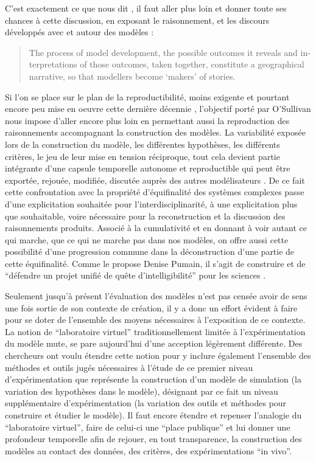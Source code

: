 C'est exactement ce que nous dit \textcites{OSullivan2004,Millington2012}, il faut aller plus loin et donner toute ses chances à cette discussion, en exposant le raisonnement, et les discours développés avec et autour des modèles :

\foreignblockquote{english}[\cite{OSullivan2004}]{The process of model development, the possible outcomes it reveals and interpretations of those outcomes, taken together, constitute a geographical narrative, so that modellers become ‘makers’ of stories.}

Si l'on se place sur le plan de la reproductibilité, moins exigente et pourtant encore peu mise en oeuvre cette dernière décennie \autocite{Wilensky2007a}, l'objectif porté par O'Sullivan nous impose d'aller encore plus loin en permettant aussi la reproduction des raisonnements accompagnant la construction des modèles. La variabilité exposée lors de la construction du modèle, les différentes hypothèses, les différents critères, le jeu de leur mise en tension réciproque, tout cela devient partie intégrante d'une capsule temporelle autonome et reproductible qui peut être exportée, rejouée, modifiée, discutée auprès des autres modélisateurs . De ce fait cette confrontation avec la propriété d'équifinalité des systèmes complexes passe d'une explicitation souhaitée pour l'interdisciplinarité, à une explicitation plus que souhaitable, voire nécessaire pour la reconstruction et la discussion des raisonnements produits. Associé à la cumulativité et en donnant à voir autant ce qui marche, que ce qui ne marche pas dans nos modèles, on offre aussi cette possibilité d'une progression commune dans la déconstruction d'une partie de cette équifinalité. Comme le propose Denise Pumain, il s'agit de construire et de \enquote{défendre un projet unifié de quête d'intelligibilité} pour les sciences \autocite[157-158]{Mathieu2014}.

Seulement jusqu'à présent l'évaluation des modèles n'est pas censée avoir de sens une fois sortie de son contexte de création, il y a donc un effort évident à faire pour se doter de l'ensemble des moyens nécessaires à l'exposition de ce contexte. La notion de \enquote{laboratoire virtuel} traditionnellement limitée à l'expérimentation du modèle mute, se pare aujourd'hui d'une acception légèrement différente. Des chercheurs \autocites{Schmitt2014, Amblard2003} ont voulu étendre cette notion pour y inclure également l'ensemble des méthodes et outils jugés nécessaires à l'étude de ce premier niveau d'expérimentation que représente la construction d'un modèle de simulation (la variation des hypothèses dans le modèle), désignant par ce fait un niveau supplémentaire d’expérimentation (la variation des outils et méthodes pour construire et étudier le modèle). Il faut encore étendre et repenser l'analogie du \enquote{laboratoire virtuel}, faire de celui-ci une \enquote{place publique} et lui donner une profondeur temporelle afin de rejouer, en tout transparence, la construction des modèles au contact des données, des critères, des expérimentations \foreignquote{latin}{in vivo}.





